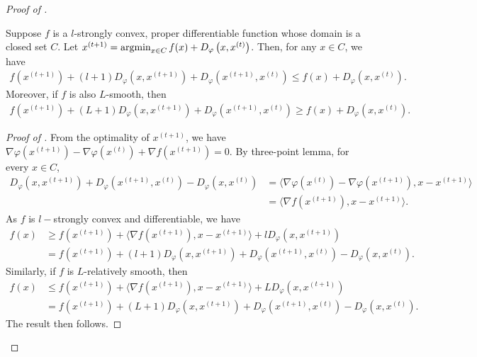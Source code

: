 \begin{proof}[Proof of ]
\begin{lemma}
    \label{lemma:bregman-minimizer-property}
    Suppose $f$ is a $l$-strongly convex, proper differentiable function whose domain is a closed set
    $C$. Let $ x^{(t+1)} = \operatorname*{argmin}_{x \in C} f(x) + D_{\varphi}\left(x, x^{(t)} \right)$.
    Then, for any $x \in C$, we have
    \begin{align}
        f(x^{(t+1)}) + (l+1) D_{\varphi}(x, x^{(t+1)}) + D_{\varphi} (x^{(t+1)}, x^{(t)})
        \leq f(x) + D_{\varphi} (x, x^{(t)}).
    \end{align}
    Moreover, if $f$ is also $L$-smooth, then
    \begin{align}
            f(x^{(t+1)}) + (L+1) D_{\varphi}(x, x^{(t+1)}) + D_{\varphi} (x^{(t+1)}, x^{(t)})
            \geq f(x) + D_{\varphi} (x, x^{(t)}).
        \end{align}
\end{lemma}
\begin{proof}[Proof of ]
    From the optimality of $x^{(t+1)}$, we have
    $\nabla \varphi(x^{(t+1)}) - \nabla \varphi(x^{(t)}) + \nabla f(x^{(t+1)}) = 0$.
    By three-point lemma, for every $x \in C$,
    \begin{align}
        D_{\varphi}(x, x^{(t+1)}) + D_{\varphi} (x^{(t+1)}, x^{(t)}) - D_{\varphi} (x, x^{(t)}) &= \langle \nabla \varphi(x^{(t)}) - \nabla \varphi(x^{(t+1)}), x - x^{(t+1)} \rangle \\
        &= \langle \nabla f(x^{(t+1)}), x - x^{(t+1)} \rangle.
    \end{align}
    As $f$ is $l-$strongly convex and differentiable, we have
    \begin{align}
        f(x) &\geq f(x^{(t+1)}) + \langle \nabla f(x^{(t+1)}), x -
                x^{(t+1)} \rangle  + l D_{\varphi}(x, x^{(t+1)})\\
        &=         f(x^{(t+1)}) + (l+1) D_{\varphi}(x, x^{(t+1)})
        + D_{\varphi} (x^{(t+1)}, x^{(t)}) - D_{\varphi} (x, x^{(t)}).
    \end{align}
    Similarly, if $f$ is $L$-relatively smooth, then
    \begin{align}
        f(x) &\leq f(x^{(t+1)}) + \langle \nabla f(x^{(t+1)}), x -
                x^{(t+1)} \rangle  + L D_{\varphi}(x, x^{(t+1)})\\
        &=         f(x^{(t+1)}) + (L+1) D_{\varphi}(x, x^{(t+1)})
        + D_{\varphi} (x^{(t+1)}, x^{(t)}) - D_{\varphi} (x, x^{(t)}).
    \end{align}
    The result then follows.
\end{proof}


\end{proof}
